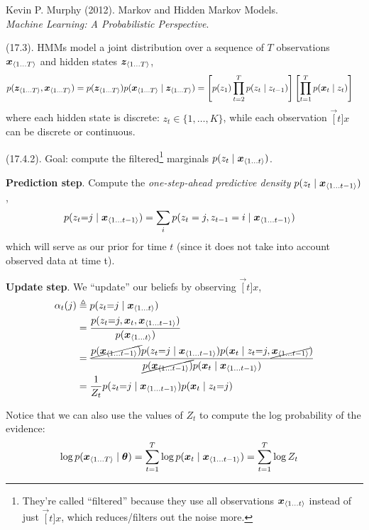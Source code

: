 \documentclass[11pt]{article}
\begin{document}

\vspace{-1.7em}
{\scriptsize Kevin P. Murphy (2012). Markov and Hidden Markov Models.\\ \textit{Machine Learning: A Probabilistic Perspective}.\\ }

\p {} (17.3). HMMs model a joint distribution over a sequence of $T$ observations $\slice[T]{x}$ and hidden states $\slice[T]{z}$,
\begin{align}
	p(\slice[T]{z}, \slice[T]{x})
		&= p(\slice[T]{z}) p(\slice[T]{x} \mid \slice[T]{z})
		= \left[ p(z_1) \prod_{t=2}^{T} p(z_t \mid z_{t-1})  \right]
			\left[ \prod_{t=1}^T p(\vec[t]{x} \mid z_t) \right]
\end{align}
where each hidden state is discrete: $z_t \in \{1, \ldots, K \}$, while each observation $\vec[t]{x}$ can be discrete or continuous.

\myspace
\p {} (17.4.2). Goal: compute the filtered\footnote{They're called ``filtered'' because they use all observations $\slice[t]{x}$ instead of just $\vec[t]{x}$, which reduces/filters out the noise more.} marginals $p(z_t \mid \slice[t]{x})$.
\begin{compactenum}
	\item \textbf{Prediction step}. Compute the \textit{one-step-ahead predictive density} $p(z_t \mid \slice[t-1]{x})$,
	\begin{align}
		p(z_t {=} j \mid \slice[t-1]{x})
			&= \sum_i p(z_t = j, z_{t-1} = i \mid \slice[t-1]{x}) 
	\end{align}
	which will serve as our prior for time $t$ (since it does not take into account observed data at time t). 
	
	\item \textbf{Update step}. We ``update'' our beliefs by observing $\vec[t]{x}$,
	\begin{align}
		\alpha_t(j)
			&\triangleq p(z_t {=} j \mid \slice[t]{x}) \\
			&= \frac{  p(z_t {=} j, \vec[t]{x}, \slice[t-1]{x}) }{  p(\slice[t]{x}) } \\
			&= \frac{ \cancel{ p(\slice[t-1]{x}) } p(z_t{=}j \mid \slice[t-1]{x}) p(\vec[t]{x} \mid z_t {=} j, \cancel{ \slice[t-1]{x}  }) }{
				\cancel{  p(\slice[t-1]{x}) } p(\vec[t]{x} \mid \slice[t-1]{x}) } \\
			&= \inv{Z_t} p(z_t {=} j \mid \slice[t-1]{x}) p(\vec[t]{x} \mid z_t {=} j)
	\end{align}
\end{compactenum}
Notice that we can also use the values of $Z_t$ to compute the log probability of the evidence:
\begin{align}
	\log p(\slice[T]{x} \mid \vec\theta)
		&= \sum_{t=1}^{T} \log p(\vec[t]{x} \mid \slice[t-1]{x}) 
		= \sum_{t=1}^T \log Z_t
\end{align}
\end{document}

